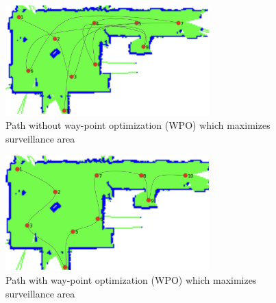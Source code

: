 \begin{figure}[h]
  \centering
  \includegraphics[width=0.7\textwidth, height=0.3\textheight]{Bilder/without_wpo.png}
  \caption{Path without way-point optimization (WPO) which maximizes surveillance area}
  \label{fig:waypoints without waypoint optimization (WPO) only maximizes surveillance area}
\end{figure}


\begin{figure}[h]
  \centering
  \includegraphics[width=0.7\textwidth, height=0.3\textheight]{Bilder/with_wpo.png}
  \caption{Path with way-point optimization (WPO) which maximizes surveillance area}
  \label{fig:waypoints with waypoint optimization (WPO) which also optimizes path that maximizes surveillance area}
\end{figure}











